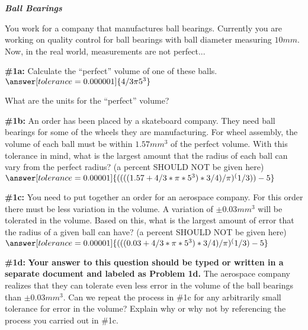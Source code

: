 \documentclass[handout,nooutcomes]{ximera}
\begin{document}
\begin{problem}{\textbf{\textit{Ball Bearings}}}

You work for a company that manufactures ball bearings. Currently you are working on quality control for ball bearings with ball diameter measuring $10mm$. Now, in the real world, measurements are not perfect...
    \begin{problem}{\textbf{\#1a:}}
    Calculate the ``perfect'' volume of one of these balls.
    $\answer[tolerance=0.000001]{4/3 \pi 5^3}$
    
    What are the units for the ``perfect'' volume?
    \begin{multipleChoice}
    \end{multipleChoice}
  
    \end{problem}
    \begin{problem}{\textbf{\#1b:}}
    An order has been placed by a skateboard company. They need ball bearings for some of the wheels they are manufacturing. For wheel assembly, the volume of each ball must be within $1.57mm^3$ of the perfect volume. With this tolerance in mind, what is the largest amount that the radius of each ball can vary from the perfect radius? (a percent SHOULD NOT be given here)
    $\answer[tolerance=0.00001]{((((1.57+4/3 * \pi*5^3)*3/4)/\pi)^(1/3))-5}$
    \end{problem}
    \begin{problem}{\textbf{\#1c:}}
    You need to put together an order for an aerospace company. For this order there must be less variation in the volume. A variation of $\pm0.03mm^3$ will be tolerated in the volume. Based on this, what is the largest amount of error that the radius of a given ball can have? (a percent SHOULD NOT be given here)
    $\answer[tolerance=0.00001]{(((0.03+4/3 * \pi*5^3)*3/4)/\pi)^(1/3)-5}$    
    \end{problem}
    
    
    \begin{problem}{\textbf{\#1d:}}
    \textbf{Your answer to this question should be typed or written in a separate document and labeled as Problem 1d.}
    The aerospace company realizes that they can tolerate even less error in the volume of the ball bearings than $\pm 0.03 mm^3$.  Can we repeat the process in \#1c for any arbitrarily small tolerance for error in the volume?  Explain why or why not by referencing the process you carried out in \#1c.
    \end{problem}
\end{problem}
\end{document}
